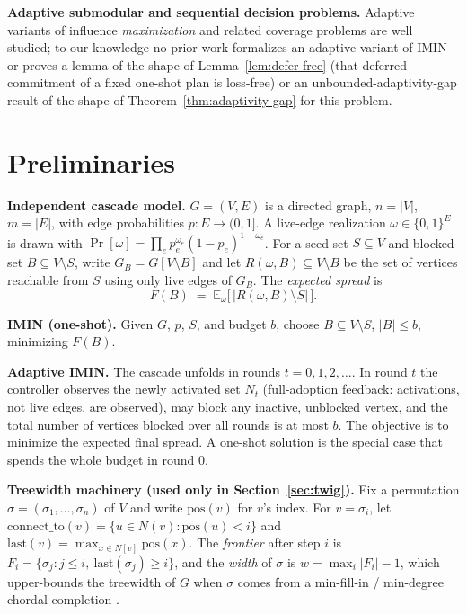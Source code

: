 \documentclass[ijoc,sglanonrev]{informs4}
\newcommand{\Rspread}{R}
\newcommand{\FF}{F}
\begin{document}
\textbf{Adaptive submodular and sequential decision problems.} Adaptive
variants of influence \emph{maximization} and related coverage problems are
well studied; to our knowledge no prior work formalizes an adaptive variant
of IMIN or proves a lemma of the shape of Lemma~\ref{lem:defer-free} (that
deferred commitment of a fixed one-shot plan is loss-free) or an
unbounded-adaptivity-gap result of the shape of
Theorem~\ref{thm:adaptivity-gap} for this problem.

\section{Preliminaries}\label{sec:prelim}

\textbf{Independent cascade model.} $G=(V,E)$ is a directed graph,
$n=|V|$, $m=|E|$, with edge probabilities $p:E\to(0,1]$. A live-edge
realization $\omega\in\{0,1\}^E$ is drawn with
$\Pr[\omega]=\prod_{e}p_e^{\omega_e}(1-p_e)^{1-\omega_e}$. For a seed set
$S\subseteq V$ and blocked set $B\subseteq V\setminus S$, write
$G_B=G[V\setminus B]$ and let $\Rspread(\omega,B)\subseteq V\setminus B$ be
the set of vertices reachable from $S$ using only live edges of $G_B$. The
\emph{expected spread} is
\begin{equation}\label{eq:spread}
\FF(B)\;=\;\mathbb E_\omega\bigl[\,|\Rspread(\omega,B)\setminus S|\,\bigr].
\end{equation}

\textbf{IMIN (one-shot).} Given $G$, $p$, $S$, and budget $b$, choose
$B\subseteq V\setminus S$, $|B|\le b$, minimizing $\FF(B)$.

\textbf{Adaptive IMIN.} The cascade unfolds in rounds $t=0,1,2,\dots$. In
round $t$ the controller observes the newly activated set $N_t$
(full-adoption feedback: activations, not live edges, are observed), may
block any inactive, unblocked vertex, and the total number of vertices
blocked over all rounds is at most $b$. The objective is to minimize the
expected final spread. A one-shot solution is the special case that spends
the whole budget in round $0$.

\textbf{Treewidth machinery (used only in Section~\ref{sec:twig}).} Fix a
permutation $\sigma=(\sigma_1,\dots,\sigma_n)$ of $V$ and write
$\mathrm{pos}(v)$ for $v$'s index. For $v=\sigma_i$, let
$\mathrm{connect\_to}(v)=\{u\in N(v):\mathrm{pos}(u)<i\}$ and
$\mathrm{last}(v)=\max_{x\in N[v]}\mathrm{pos}(x)$. The \emph{frontier}
after step $i$ is $F_i=\{\sigma_j:j\le i,\ \mathrm{last}(\sigma_j)\ge i\}$,
and the \emph{width} of $\sigma$ is $w=\max_i|F_i|-1$, which upper-bounds
the treewidth of $G$ when $\sigma$ comes from a min-fill-in / min-degree
chordal completion \citep{bodlaender1988,cygan2015}.
\end{document}
